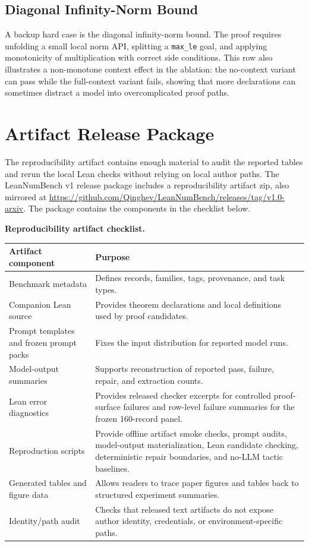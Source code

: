 \subsection{Diagonal Infinity-Norm Bound}

A backup hard case is the diagonal infinity-norm bound. The proof requires
unfolding a small local norm API, splitting a \texttt{max\_le} goal, and
applying monotonicity of multiplication with correct side conditions. This row
also illustrates a non-monotone context effect in the ablation: the no-context
variant can pass while the full-context variant fails, showing that more
declarations can sometimes distract a model into overcomplicated proof paths.

\section{Artifact Release Package}
\label{app:artifact}

The reproducibility artifact contains enough material to audit the
reported tables and rerun the local Lean checks without relying on local
author paths. The LeanNumBench v1 release package includes a reproducibility
artifact zip, also mirrored at
\url{https://github.com/Qinghev/LeanNumBench/releases/tag/v1.0-arxiv}.
The package contains the components in the checklist below.

\begin{center}
\small
\textbf{Reproducibility artifact checklist.}

\vspace{0.3em}
\begin{tabularx}{\linewidth}{lX}
\toprule
Artifact component & Purpose\\
\midrule
Benchmark metadata & Defines records, families, tags, provenance, and task
types.\\
Companion Lean source & Provides theorem declarations and local
definitions used by proof candidates.\\
Prompt templates and frozen prompt packs & Fixes the input distribution for
reported model runs.\\
Model-output summaries & Supports reconstruction of reported pass, failure,
repair, and extraction counts.\\
Lean error diagnostics & Provides released checker excerpts for controlled
proof-surface failures and row-level failure summaries for the frozen
160-record panel.\\
Reproduction scripts & Provide offline artifact smoke checks, prompt audits,
model-output materialization, Lean candidate checking, deterministic repair
boundaries, and no-LLM tactic baselines.\\
Generated tables and figure data & Allows readers to trace paper figures and
tables back to structured experiment summaries.\\
Identity/path audit & Checks that released text artifacts do not expose author
identity, credentials, or environment-specific paths.\\
\bottomrule
\end{tabularx}
\end{center}

